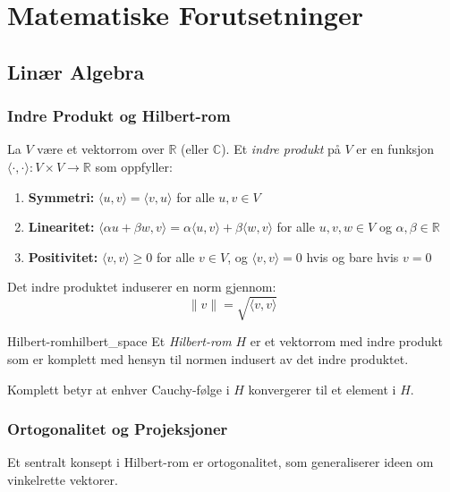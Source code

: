 \chapter{Matematiske Forutsetninger}
\label{chap:preliminaries}

\section{Linær Algebra}
\label{sec:linear_algebra}

\subsection{Indre Produkt og Hilbert-rom}
La $V$ være et vektorrom over $\mathbb{R}$ (eller $\mathbb{C}$). Et \emph{indre produkt} på $V$ er en funksjon $\langle \cdot, \cdot \rangle : V \times V \to \mathbb{R}$ som oppfyller:
\begin{enumerate}
	\item \textbf{Symmetri:} $\langle u, v \rangle = \langle v, u \rangle$ for alle $u, v \in V$
	\item \textbf{Linearitet:} $\langle \alpha u + \beta w, v \rangle = \alpha \langle u, v \rangle + \beta \langle w, v \rangle$ for alle $u, v, w \in V$ og $\alpha, \beta \in \mathbb{R}$
	\item \textbf{Positivitet:} $\langle v, v \rangle \geq 0$ for alle $v \in V$, og $\langle v, v \rangle = 0$ hvis og bare hvis $v = 0$
\end{enumerate}

Det indre produktet induserer en norm gjennom:
\begin{equation}
	\|v\| = \sqrt{\langle v, v \rangle}
\end{equation}

\begin{definition}{Hilbert-rom}{hilbert_space}
	Et \emph{Hilbert-rom} $H$ er et vektorrom med indre produkt som er komplett med hensyn til normen indusert av det indre produktet.

	Komplett betyr at enhver Cauchy-følge i $H$ konvergerer til et element i $H$.
\end{definition}

\subsection{Ortogonalitet og Projeksjoner}

Et sentralt konsept i Hilbert-rom er ortogonalitet, som generaliserer ideen om vinkelrette vektorer.

